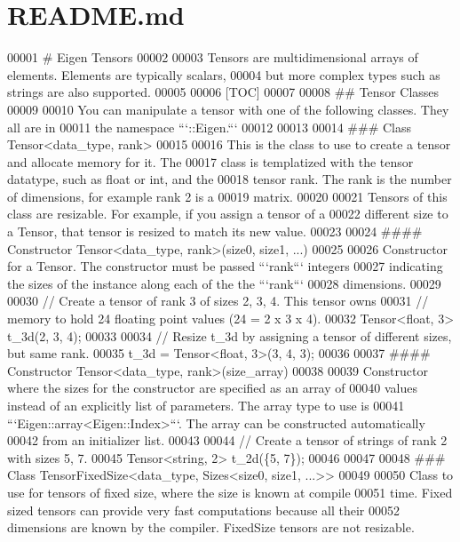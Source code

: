 \hypertarget{matio_2visual__studio_2test_2eigen_2unsupported_2_eigen_2_c_x_x11_2src_2_tensor_2_r_e_a_d_m_e_8md_source}{}\section{R\+E\+A\+D\+M\+E.\+md}

\begin{DoxyCode}
00001 # Eigen Tensors
00002 
00003 Tensors are multidimensional arrays of elements. Elements are typically scalars,
00004 but more complex types such as strings are also supported.
00005 
00006 [TOC]
00007 
00008 ## Tensor Classes
00009 
00010 You can manipulate a tensor with one of the following classes.  They all are in
00011 the namespace ```::Eigen.```
00012 
00013 
00014 ### Class Tensor<data\_type, rank>
00015 
00016 This is the class to use to create a tensor and allocate memory for it.  The
00017 class is templatized with the tensor datatype, such as float or int, and the
00018 tensor rank.  The rank is the number of dimensions, for example rank 2 is a
00019 matrix.
00020 
00021 Tensors of this class are resizable.  For example, if you assign a tensor of a
00022 different size to a Tensor, that tensor is resized to match its new value.
00023 
00024 #### Constructor Tensor<data\_type, rank>(size0, size1, ...)
00025 
00026 Constructor for a Tensor.  The constructor must be passed ```rank``` integers
00027 indicating the sizes of the instance along each of the the ```rank```
00028 dimensions.
00029 
00030     // Create a tensor of rank 3 of sizes 2, 3, 4.  This tensor owns
00031     // memory to hold 24 floating point values (24 = 2 x 3 x 4).
00032     Tensor<float, 3> t\_3d(2, 3, 4);
00033 
00034     // Resize t\_3d by assigning a tensor of different sizes, but same rank.
00035     t\_3d = Tensor<float, 3>(3, 4, 3);
00036 
00037 #### Constructor Tensor<data\_type, rank>(size\_array)
00038 
00039 Constructor where the sizes for the constructor are specified as an array of
00040 values instead of an explicitly list of parameters.  The array type to use is
00041 ```Eigen::array<Eigen::Index>```.  The array can be constructed automatically
00042 from an initializer list.
00043 
00044     // Create a tensor of strings of rank 2 with sizes 5, 7.
00045     Tensor<string, 2> t\_2d(\{5, 7\});
00046 
00047 
00048 ### Class TensorFixedSize<data\_type, Sizes<size0, size1, ...>>
00049 
00050 Class to use for tensors of fixed size, where the size is known at compile
00051 time.  Fixed sized tensors can provide very fast computations because all their
00052 dimensions are known by the compiler.  FixedSize tensors are not resizable.

\end{DoxyCode}
